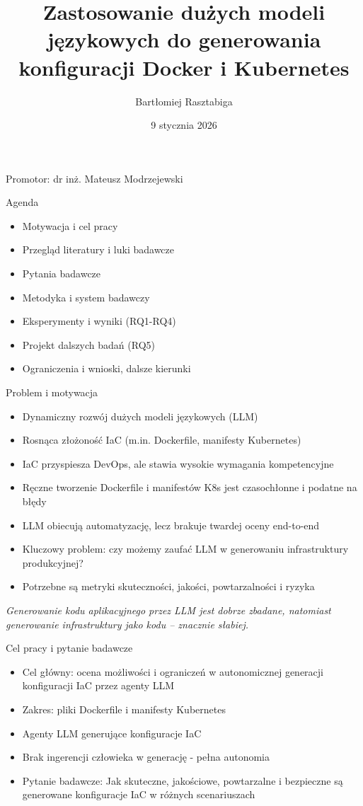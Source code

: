 \documentclass[aspectratio=169]{beamer}
\title{Zastosowanie dużych modeli językowych do generowania konfiguracji Docker i Kubernetes}
\author{Bartłomiej Rasztabiga}
\institute{Instytut Automatyki i Informatyki Stosowanej}
\date{9 stycznia 2026}
\newcommand{\supervisor}{Promotor: dr inż. Mateusz Modrzejewski}
\begin{document}
\begin{frame}
    \titlepage
    \vspace{-1.5em}
    \centering
    \supervisor
\end{frame}

\begin{frame}{Agenda}
    \begin{itemize}
        \item Motywacja i cel pracy
        \item Przegląd literatury i luki badawcze
        \item Pytania badawcze
        \item Metodyka i system badawczy
        \item Eksperymenty i wyniki (RQ1-RQ4)
        \item Projekt dalszych badań (RQ5)
        \item Ograniczenia i wnioski, dalsze kierunki
    \end{itemize}
\end{frame}

\begin{frame}{Problem i motywacja}
    \begin{itemize}
        \item Dynamiczny rozwój dużych modeli językowych (LLM)
        \item Rosnąca złożoność IaC (m.in. Dockerfile, manifesty Kubernetes)
        \item IaC przyspiesza DevOps, ale stawia wysokie wymagania kompetencyjne
        \item Ręczne tworzenie Dockerfile i manifestów K8s jest czasochłonne i podatne na błędy
        \item LLM obiecują automatyzację, lecz brakuje twardej oceny end-to-end
        \item Kluczowy problem: czy możemy zaufać LLM w generowaniu infrastruktury produkcyjnej?
        \item Potrzebne są metryki skuteczności, jakości, powtarzalności i ryzyka
    \end{itemize}
    \vspace{0.5em}
    \textit{Generowanie kodu aplikacyjnego przez LLM jest dobrze zbadane, natomiast generowanie infrastruktury jako kodu -- znacznie słabiej.}
\end{frame}

\begin{frame}{Cel pracy i pytanie badawcze}
    \begin{itemize}
        \item Cel główny: ocena możliwości i ograniczeń w autonomicznej generacji konfiguracji IaC przez agenty LLM
        \item Zakres: pliki Dockerfile i manifesty Kubernetes
        \item Agenty LLM generujące konfiguracje IaC
        \item Brak ingerencji człowieka w generację - pełna autonomia
        \item Pytanie badawcze: Jak skuteczne, jakościowe, powtarzalne i bezpieczne są generowane konfiguracje IaC w różnych scenariuszach
    \end{itemize}
\end{frame}
\end{document}
